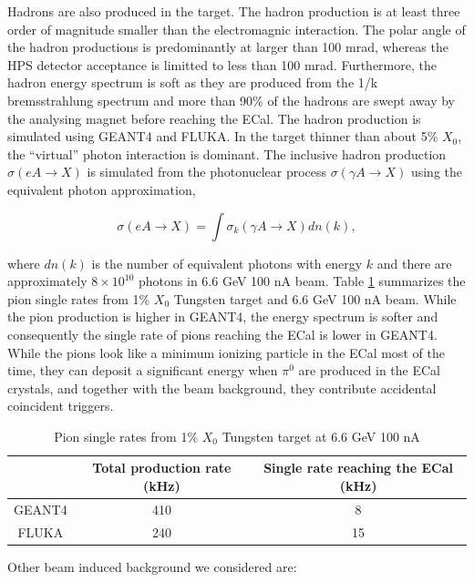 Hadrons are also produced in the target. The hadron production is at least three order
of magnitude smaller than the electromagnic interaction. The polar angle of the hadron productions
is predominantly at larger than 100 mrad, whereas the HPS detector acceptance is limitted to less than
100 mrad. Furthermore, the hadron energy spectrum is soft as they are produced from the 1/k bremsstrahlung
spectrum and more than 90\% of the hadrons are swept away by the analysing magnet before reaching the ECal.
 The hadron production is simulated using GEANT4 and FLUKA. In the target thinner than
about 5\% $X_0$, the ``virtual'' photon interaction is dominant. \cite{mohring} The inclusive hadron
production ${\sigma (eA\rightarrow X)}$ is simulated from the photonuclear process ${\sigma (\gamma A
\rightarrow X)}$ using the equivalent photon approximation,

$$ \sigma (eA \rightarrow X) = \int \sigma_k(\gamma A \rightarrow X) dn(k), $$

\noindent
where $dn(k)$ is the number of equivalent photons with energy $k$ \cite{budnev} and there are 
approximately $8 \times 10^{10} $ photons in 6.6 GeV 100 nA beam. 
Table \ref{tab:pion} summarizes the pion single rates from 1\% $X_0$ Tungsten target
and 6.6 GeV 100 nA beam. While the pion production is higher in GEANT4, the energy spectrum is softer and
consequently the single rate of pions reaching the ECal is lower in GEANT4. While the pions look like a minimum 
ionizing particle in the ECal most of the time, they can deposit a significant energy when ${\pi^0}$ are
produced in the ECal crystals, and together with the beam background, they contribute accidental coincident triggers. 

\begin{table}[h]
\begin{center}
\begin{tabular}{|c|c|c|} \hline
  & Total production rate (kHz) & Single rate reaching the ECal (kHz) \\ \hline
GEANT4 & 410 & 8 \\ \hline
FLUKA  & 240 & 15 \\ \hline
\end{tabular}
\end{center}
\caption{\small{Pion single rates from 1\% $X_0$ Tungsten target at 6.6 GeV 100 nA}}
\label{tab:pion}
\end{table}

\pagebreak
\noindent
Other beam induced background we considered are:

